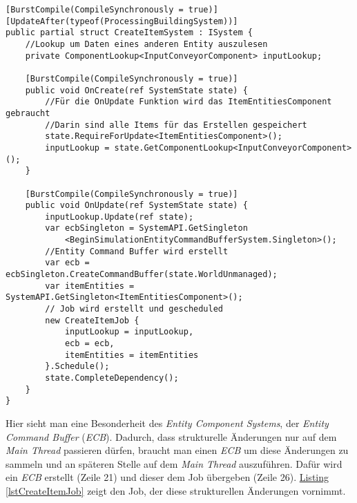 \begin{lstlisting}[style=code, caption={[Erstellung eines Items im datenorientierten Ansatz.]Erstellung eines Items im datenorientierten Ansatz. Zur Erstellung eines Items aus einem Job, wird ein \textit{Entity Command Buffer} verwendet.}]
[BurstCompile(CompileSynchronously = true)]
[UpdateAfter(typeof(ProcessingBuildingSystem))]
public partial struct CreateItemSystem : ISystem {
    //Lookup um Daten eines anderen Entity auszulesen
    private ComponentLookup<InputConveyorComponent> inputLookup;

    [BurstCompile(CompileSynchronously = true)]
    public void OnCreate(ref SystemState state) {
      	//Für die OnUpdate Funktion wird das ItemEntitiesComponent gebraucht
      	//Darin sind alle Items für das Erstellen gespeichert
        state.RequireForUpdate<ItemEntitiesComponent>();
        inputLookup = state.GetComponentLookup<InputConveyorComponent>();
    }
    
    [BurstCompile(CompileSynchronously = true)]
    public void OnUpdate(ref SystemState state) {
        inputLookup.Update(ref state);
        var ecbSingleton = SystemAPI.GetSingleton
            <BeginSimulationEntityCommandBufferSystem.Singleton>();
        //Entity Command Buffer wird erstellt
        var ecb = ecbSingleton.CreateCommandBuffer(state.WorldUnmanaged);
        var itemEntities = SystemAPI.GetSingleton<ItemEntitiesComponent>();
        // Job wird erstellt und gescheduled
        new CreateItemJob {
            inputLookup = inputLookup,
            ecb = ecb,
            itemEntities = itemEntities
        }.Schedule();
        state.CompleteDependency();
    }
}
\end{lstlisting}
Hier sieht man eine Besonderheit des \textit{Entity Component Systems}, der \textit{Entity Command Buffer} (\textit{ECB}). Dadurch, dass strukturelle Änderungen nur auf dem \textit{Main Thread} passieren dürfen, braucht man einen \textit{ECB} um diese Änderungen zu sammeln und an späteren Stelle auf dem \textit{Main Thread} auszuführen. Dafür wird ein \textit{ECB} erstellt (Zeile 21) und dieser dem Job übergeben (Zeile 26). \hyperref[lstCreateItemJob]{Listing \ref{lstCreateItemJob}} zeigt den Job, der diese strukturellen Änderungen vornimmt.
